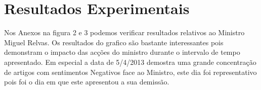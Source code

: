 \section{Resultados Experimentais}
\hspace{15pt} Nos Anexos na figura 2 e 3 podemos verificar resultados relativos ao Ministro Miguel Relvas. Os resultados do grafico são bastante interessantes pois demonstram o impacto das acções do ministro durante o intervalo de tempo apresentado. Em especial a data de 5/4/2013 demostra uma grande concentração de artigos com sentimentos Negativos face ao Ministro, este dia foi representativo pois foi o dia em que este apresentou a sua demissão. 
